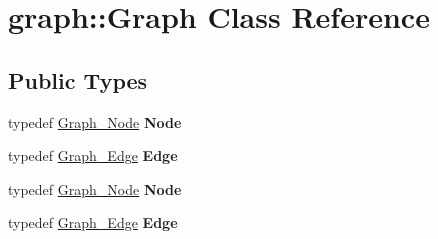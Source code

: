 \hypertarget{classgraph_1_1Graph}{
\section{graph::Graph Class Reference}
\label{classgraph_1_1Graph}
}
\subsection*{Public Types}
\begin{DoxyCompactItemize}
\item 
\hypertarget{classgraph_1_1Graph_a2a148e8d341b4850e506e4ca9a10845f}{
typedef \hyperlink{classgraph_1_1Graph__Node}{Graph\_\-Node} {\bfseries Node}}
\label{classgraph_1_1Graph_a2a148e8d341b4850e506e4ca9a10845f}

\item 
\hypertarget{classgraph_1_1Graph_ae7ba626728a03ceb51bccd5ee4ec72ca}{
typedef \hyperlink{classgraph_1_1Graph__Edge}{Graph\_\-Edge} {\bfseries Edge}}
\label{classgraph_1_1Graph_ae7ba626728a03ceb51bccd5ee4ec72ca}

\item 
\hypertarget{classgraph_1_1Graph_a2a148e8d341b4850e506e4ca9a10845f}{
typedef \hyperlink{classgraph_1_1Graph__Node}{Graph\_\-Node} {\bfseries Node}}
\label{classgraph_1_1Graph_a2a148e8d341b4850e506e4ca9a10845f}

\item 
\hypertarget{classgraph_1_1Graph_ae7ba626728a03ceb51bccd5ee4ec72ca}{
typedef \hyperlink{classgraph_1_1Graph__Edge}{Graph\_\-Edge} {\bfseries Edge}}
\label{classgraph_1_1Graph_ae7ba626728a03ceb51bccd5ee4ec72ca}

\end{DoxyCompactItemize}
